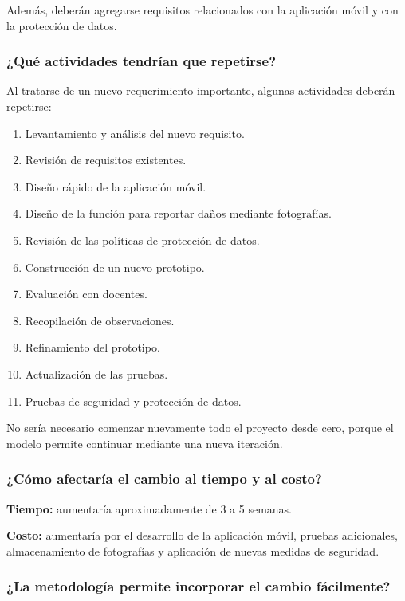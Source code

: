 \documentclass[pdflatex,sn-mathphys-num]{sn-jnl}%
\theoremstyle{thmstyleone}%
\theoremstyle{thmstyletwo}%
\theoremstyle{thmstylethree}%
\begin{document}
 Además, deberán agregarse requisitos relacionados con la aplicación móvil y con la protección de datos.
 
 
 \subsubsection{¿Qué actividades tendrían que repetirse?}
 
 Al tratarse de un nuevo requerimiento importante, algunas actividades deberán repetirse:
 
 \begin{enumerate}
 	\item Levantamiento y análisis del nuevo requisito.
 	\item Revisión de requisitos existentes.
 	\item Diseño rápido de la aplicación móvil.
 	\item Diseño de la función para reportar daños mediante fotografías.
 	\item Revisión de las políticas de protección de datos.
 	\item Construcción de un nuevo prototipo.
 	\item Evaluación con docentes.
 	\item Recopilación de observaciones.
 	\item Refinamiento del prototipo.
 	\item Actualización de las pruebas.
 	\item Pruebas de seguridad y protección de datos.
 \end{enumerate}
 
 No sería necesario comenzar nuevamente todo el proyecto desde cero, porque el modelo permite continuar mediante una nueva iteración.
 
 
 \subsubsection{¿Cómo afectaría el cambio al tiempo y al costo?}
 
 \textbf{Tiempo:} aumentaría aproximadamente de 3 a 5 semanas.
 
 \textbf{Costo:} aumentaría por el desarrollo de la aplicación móvil, pruebas adicionales, almacenamiento de fotografías y aplicación de nuevas medidas de seguridad.
 
 
 \subsubsection{¿La metodología permite incorporar el cambio fácilmente?}
 
\end{document}
